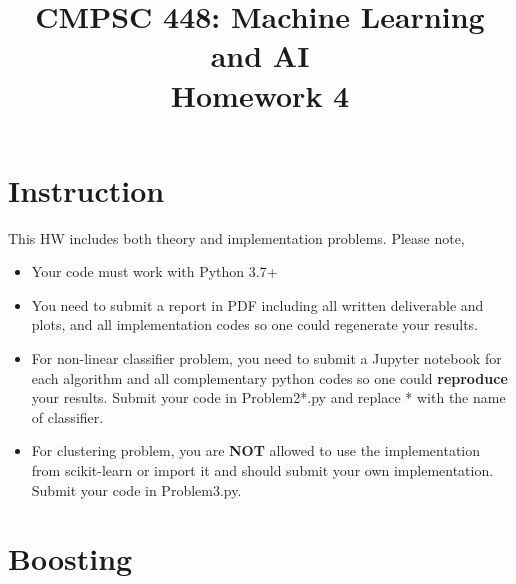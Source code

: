 \documentclass[11pt]{article}
\title{CMPSC 448: Machine Learning and AI \\ Homework 4}
\author{}
\date{}
\theoremstyle{quest}
\begin{document}
\maketitle


\section*{Instruction}
This HW includes both theory and implementation problems. Please note,
\begin{itemize}
    \item Your code must work with Python 3.7+
    \item You need to submit a report in PDF including all written deliverable and plots, and all implementation codes so one could regenerate your results.
    \item For non-linear classifier problem, you need to submit a Jupyter notebook for each algorithm and all complementary python codes so one could \textbf{reproduce} your results. Submit your code in \textsf{Problem2*.py} and replace * with the name of classifier.
    \item For clustering problem, you are \textbf{NOT} allowed to use the implementation from \textsf{scikit-learn} or import it and should submit your own implementation. Submit your code in \textsf{Problem3.py}.
\end{itemize}

\section*{Boosting}
\end{document}

